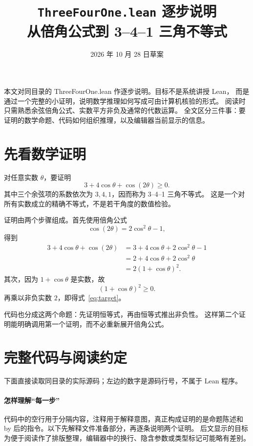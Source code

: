 \documentclass[UTF8,fontset=fandol,a4paper,11pt]{ctexart}
\title{\texttt{ThreeFourOne.lean} 逐步说明\\[0.3em]\large 从倍角公式到 3–4–1 三角不等式}
\author{}
\date{2026 年 10 月 28 日草案}
\newcommand{\code}[1]{{\small\ttfamily\def\_{\textunderscore\allowbreak}#1}}
\begin{document}
\maketitle

本文对同目录的 \code{ThreeFourOne.lean} 作逐步说明。目标不是系统讲授 Lean，
而是通过一个完整的小证明，说明数学推理如何写成可由计算机核验的形式。
阅读时只需熟悉余弦倍角公式、实数平方非负及通常的代数运算。
全文区分三件事：要证明的数学命题、代码如何组织推理，以及编辑器当前显示的信息。

\section{先看数学证明}

对任意实数 $\theta$，要证明
\begin{equation}\label{eq:target}
  3+4\cos\theta+\cos(2\theta)\ge0.
\end{equation}
其中三个余弦项的系数依次为 $3,4,1$，因而称为 3–4–1 三角不等式。
这是一个对所有实数成立的精确不等式，不是若干角度的数值检验。

证明由两个步骤组成。首先使用倍角公式
\[
  \cos(2\theta)=2\cos^2\theta-1,
\]
得到
\begin{align*}
  3+4\cos\theta+\cos(2\theta)
  &=3+4\cos\theta+2\cos^2\theta-1\\
  &=2+4\cos\theta+2\cos^2\theta\\
  &=2(1+\cos\theta)^2.
\end{align*}
其次，因为 $1+\cos\theta$ 是实数，故
\[
  (1+\cos\theta)^2\ge0.
\]
再乘以非负实数 $2$，即得式~\eqref{eq:target}。

代码也分成这两个命题：先证明恒等式，再由恒等式推出非负性。
这样第二个证明能明确调用第一个证明，而不必重新展开倍角公式。

\clearpage
\section{完整代码与阅读约定}

下面直接读取同目录的实际源码；左边的数字是源码行号，不属于 Lean 程序。

\paragraph{怎样理解“每一步”}
代码中的空行用于分隔内容，注释用于解释意图，真正构成证明的是命题陈述和
\code{by} 后的指令。以下先解释文件准备部分，再逐条说明两个证明。
后文显示的目标为便于阅读作了排版整理，编辑器中的换行、隐含参数或类型标记可能略有差别。
\end{document}
